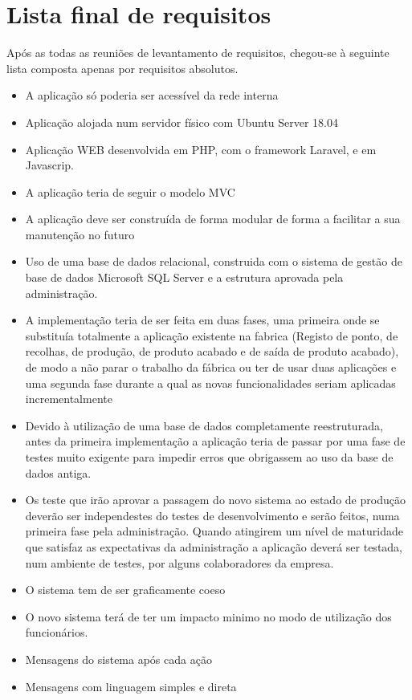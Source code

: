 \section{Lista final de requisitos}
Após as todas as reuniões de levantamento de requisitos, chegou-se à seguinte lista composta apenas por requisitos absolutos.
\begin{itemize}
	\item A aplicação só poderia ser acessível da rede interna
	\item Aplicação alojada num servidor físico com Ubuntu Server 18.04
	\item Aplicação WEB desenvolvida em PHP, com o framework Laravel, e em Javascrip.
	\item A aplicação teria de seguir o modelo MVC\label{sym:MVC}
	\item A aplicação deve ser construída de forma modular de forma a facilitar a sua manutenção no futuro
	\item Uso de uma base de dados relacional, construida com o sistema de gestão de base de dados Microsoft SQL Server e a estrutura aprovada pela administração.
	\item A implementação teria de ser feita em duas fases, uma primeira onde se substituía totalmente a aplicação existente na fabrica (Registo de ponto, de recolhas, de produção, de produto acabado e de saída de produto acabado), de modo a não parar o trabalho da fábrica ou ter de usar duas aplicações e uma segunda fase durante a qual as novas funcionalidades seriam aplicadas incrementalmente
	\item Devido à utilização de uma base de dados completamente reestruturada, antes da primeira implementação a aplicação teria de passar por uma fase de testes muito exigente para impedir erros que obrigassem ao uso da base de dados antiga.
	\item Os teste que irão aprovar a passagem do novo sistema ao estado de produção deverão ser independestes do testes de desenvolvimento e serão feitos, numa primeira fase pela administração. Quando atingirem um nível de maturidade que satisfaz as expectativas da administração a aplicação deverá ser testada, num ambiente de testes, por alguns colaboradores da empresa.
	\item O sistema tem de ser graficamente coeso
	\item O novo sistema terá de ter um impacto minimo no modo de utilização dos funcionários.
	\item Mensagens do sistema após cada ação
	\item Mensagens com linguagem simples e direta

\end{itemize}
